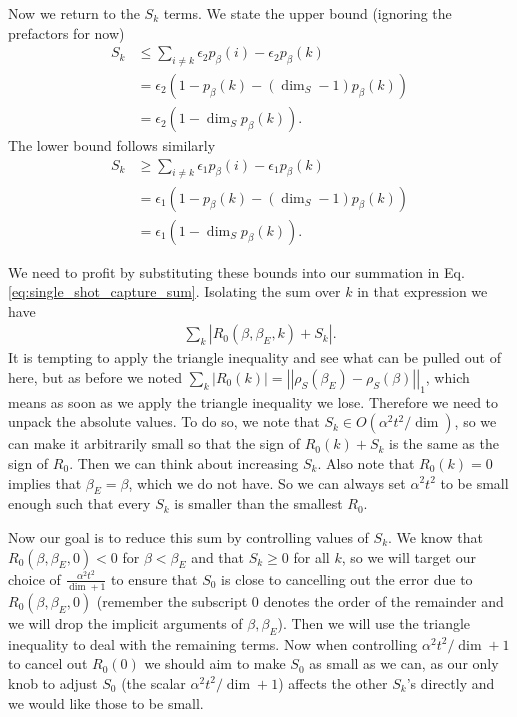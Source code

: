 \documentclass{article}
\newcommand{\abs}[1]{\left| #1 \right|}
\newcommand{\norm}[1]{\left| \left| #1 \right| \right|}
\newcommand{\bigo}[1]{O\left( #1 \right)}
\begin{document}
Now we return to the $S_k$ terms. We state the upper bound (ignoring the prefactors for now)
\begin{align}
    S_k &\leq \sum_{i \neq k} \epsilon_{2} p_{\beta}(i) - \epsilon_{2} p_{\beta}(k) \\
    &= \epsilon_{2} (1 - p_{\beta}(k) - (\dim_S - 1)p_{\beta}(k)) \\
    &= \epsilon_{2}(1 - \dim_S p_{\beta}(k)).
\end{align}
The lower bound follows similarly
\begin{align}
    S_{k} &\geq \sum_{i \neq k} \epsilon_{1} p_{\beta}(i) - \epsilon_{1} p_{\beta}(k) \\
    &= \epsilon_{1}(1 - p_{\beta}(k) - (\dim_S - 1) p_{\beta}(k)) \\
    &= \epsilon_{1}(1 - \dim_S p_{\beta}(k)).
\end{align}


We need to profit by substituting these bounds into our summation in Eq. \eqref{eq:single_shot_capture_sum}. Isolating the sum over $k$ in that expression we have
\begin{align}
    \sum_{k} \abs{R_0(\beta, \beta_E, k) + S_k}.
\end{align}
It is tempting to apply the triangle inequality and see what can be pulled out of here, but as before we noted $\sum_k \abs{R_0(k)} = \norm{\rho_S(\beta_E) - \rho_S(\beta)}_1$, which means as soon as we apply the triangle inequality we lose. Therefore we need to unpack the absolute values. To do so, we note that $S_k \in \bigo{\alpha^2 t^2 / \dim}$, so we can make it arbitrarily small so that the sign of $R_0(k) + S_k$ is the same as the sign of $R_0$. Then we can think about increasing $S_k$. Also note that $R_0(k) = 0$ implies that $\beta_E = \beta$, which we do not have. So we can always set $\alpha^2 t^2$ to be small enough such that every $S_k$ is smaller than the smallest $R_0$. 

Now our goal is to reduce this sum by controlling values of $S_k$. We know that $R_0(\beta, \beta_E, 0) < 0$ for $\beta < \beta_E$ and that $S_k \geq 0$ for all $k$, so we will target our choice of $\frac{\alpha^2 t^2}{\dim + 1}$ to ensure that $S_0$ is close to cancelling out the error due to $R_0(\beta, \beta_E, 0)$ (remember the subscript 0 denotes the order of the remainder and we will drop the implicit arguments of $\beta, \beta_E$). Then we will use the triangle inequality to deal with the remaining terms. Now when controlling $\alpha^2 t^2 / \dim + 1$ to cancel out $R_0(0)$ we should aim to make $S_0$ as small as we can, as our only knob to adjust $S_0$ (the scalar $\alpha^2 t^2 / \dim + 1$) affects the other $S_k$'s directly and we would like those to be small. 
\end{document}
